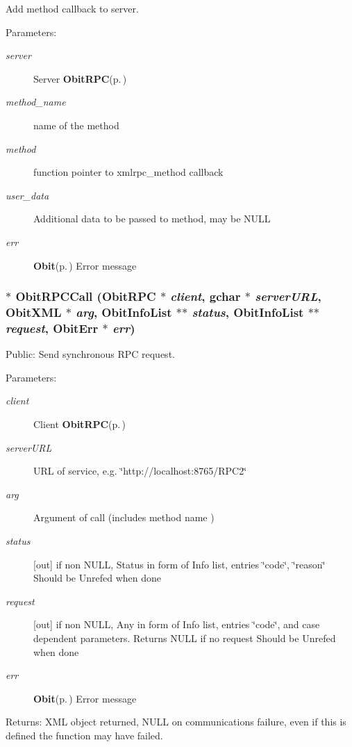 Add method callback to server. 

\begin{Desc}
\item[Parameters:]
\begin{description}
\item[{\em server}]Server {\bf Obit\-RPC}{\rm (p.\,\pageref{structObitRPC})} \item[{\em method\_\-name}]name of the method \item[{\em method}]function pointer to xmlrpc\_\-method callback \item[{\em user\_\-data}]Additional data to be passed to method, may be NULL \item[{\em err}]{\bf Obit}{\rm (p.\,\pageref{structObit})} Error message \end{description}
\end{Desc}
\subsubsection{$\ast$ Obit\-RPCCall ({\bf Obit\-RPC} $\ast$ {\em client}, gchar $\ast$ {\em server\-URL}, {\bf Obit\-XML} $\ast$ {\em arg}, {\bf Obit\-Info\-List} $\ast$$\ast$ {\em status}, {\bf Obit\-Info\-List} $\ast$$\ast$ {\em request}, {\bf Obit\-Err} $\ast$ {\em err})}\label{ObitRPC_8h_a20}


Public: Send synchronous RPC request. 

\begin{Desc}
\item[Parameters:]
\begin{description}
\item[{\em client}]Client {\bf Obit\-RPC}{\rm (p.\,\pageref{structObitRPC})} \item[{\em server\-URL}]URL of service, e.g. \char`\"{}http://localhost:8765/RPC2\char`\"{} \item[{\em arg}]Argument of call (includes method name ) \item[{\em status}][out] if non NULL, Status in form of Info list, entries \char`\"{}code\char`\"{}, \char`\"{}reason\char`\"{} Should be Unrefed when done \item[{\em request}][out] if non NULL, Any in form of Info list, entries \char`\"{}code\char`\"{}, and case dependent parameters. Returns NULL if no request Should be Unrefed when done \item[{\em err}]{\bf Obit}{\rm (p.\,\pageref{structObit})} Error message \end{description}
\end{Desc}
\begin{Desc}
\item[Returns:]XML object returned, NULL on communications failure, even if this is defined the function may have failed. \end{Desc}
